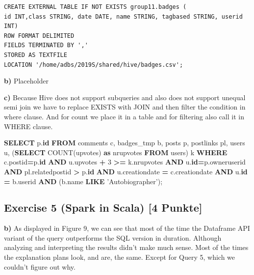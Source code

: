 \documentclass[]{article}
\newenvironment{Shaded}{\begin{snugshade}}{\end{snugshade}}
\newcommand{\DecValTok}[1]{\textcolor[rgb]{0.00,0.00,0.81}{#1}}
\newcommand{\FunctionTok}[1]{\textcolor[rgb]{0.00,0.00,0.00}{#1}}
\newcommand{\KeywordTok}[1]{\textcolor[rgb]{0.13,0.29,0.53}{\textbf{#1}}}
\newcommand{\NormalTok}[1]{#1}
\newcommand{\OperatorTok}[1]{\textcolor[rgb]{0.81,0.36,0.00}{\textbf{#1}}}
\newcommand{\StringTok}[1]{\textcolor[rgb]{0.31,0.60,0.02}{#1}}
\begin{document}
\begin{verbatim}
CREATE EXTERNAL TABLE IF NOT EXISTS group11.badges (
id INT,class STRING, date DATE, name STRING, tagbased STRING, userid INT)
ROW FORMAT DELIMITED
FIELDS TERMINATED BY ','
STORED AS TEXTFILE
LOCATION '/home/adbs/2019S/shared/hive/badges.csv';
\end{verbatim}

\textbf{b)} Placeholder

\textbf{c)} Because Hive does not support subqueries and also does not
support unequal semi join we have to replace EXISTS with JOIN and then
filter the condition in where clause. And for count we place it in a
table and for filtering also call it in WHERE clause.

\begin{Shaded}
\begin{Highlighting}[]
\KeywordTok{SELECT}\NormalTok{ p.}\KeywordTok{id}
\KeywordTok{FROM}\NormalTok{ comments c, badges_tmp b, posts p, postlinks pl, users u, (}\KeywordTok{SELECT} \FunctionTok{COUNT}\NormalTok{(upvotes) }\KeywordTok{as}\NormalTok{ nrupvotes }\KeywordTok{FROM}\NormalTok{ users) k}
\KeywordTok{WHERE}\NormalTok{ c.postid}\OperatorTok{=}\NormalTok{p.}\KeywordTok{id} 
\KeywordTok{AND}\NormalTok{ u.upvotes }\OperatorTok{+} \DecValTok{3} \OperatorTok{>=}\NormalTok{ k.nrupvotes}
\KeywordTok{AND}\NormalTok{ u.}\KeywordTok{id}\OperatorTok{=}\NormalTok{p.owneruserid }
\KeywordTok{AND}\NormalTok{ pl.relatedpostid }\OperatorTok{>}\NormalTok{ p.}\KeywordTok{id}
\KeywordTok{AND}\NormalTok{ u.creationdate }\OperatorTok{=}\NormalTok{ c.creationdate  }
\KeywordTok{AND}\NormalTok{ u.}\KeywordTok{id} \OperatorTok{=}\NormalTok{ b.userid }
\KeywordTok{AND}\NormalTok{ (b.name }\KeywordTok{LIKE} \StringTok{'Autobiographer'}\NormalTok{);}
\end{Highlighting}
\end{Shaded}

\newpage

\hypertarget{exercise-5-spark-in-scala-4-punkte}{%
\subsection{Exercise 5 (Spark in Scala) {[}4
Punkte{]}}\label{exercise-5-spark-in-scala-4-punkte}}

\textbf{b)} As displayed in Figure 9, we can see that most of the time
the Dataframe API variant of the query outperforms the SQL version in
duration. Although analyzing and interpreting the results didn't make
much sense. Most of the times the explanation plans look, and are, the
same. Except for Query 5, which we couldn't figure out why.
\end{document}
